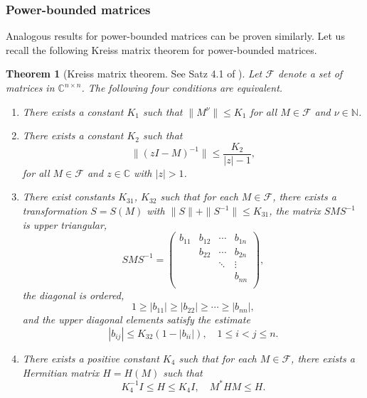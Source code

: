 \documentclass{article}
\theoremstyle{plain}%
\newtheorem{theorem}{Theorem}%
\theoremstyle{definition}%
\theoremstyle{remark}%
\newcommand{\bC}{\mathbb{C}}
\newcommand{\bN}{\mathbb{N}}
\newcommand{\cF}{\mathcal{F}}
\newcommand{\+}[1]{{\bm{#1}}}
\newcommand{\norm}[1]{\|{#1}\|}
\begin{document}
\subsubsection{Power-bounded matrices}
Analogous results for power-bounded matrices can be proven similarly. 
Let us recall the following Kreiss matrix theorem 
\cite{kreiss_stabilitatsdefinition_1962} for power-bounded matrices.
\begin{theorem}[Kreiss matrix theorem. See Satz 4.1 of 
  \cite{kreiss_stabilitatsdefinition_1962}]
  \label{thm:KMT_power}
Let $\cF$ denote a set of matrices in $\bC^{n \times n}$.
The following four conditions are equivalent.
\begin{enumerate}
  \item There exists a constant $K_1$ such that  
    $\norm{M^\nu} \le K_1$ for all $M \in \cF$ and 
    $\nu \in \bN$.
  \item There exists a constant $K_2$ such that 
    \begin{displaymath}
      \norm{(z I - M)^{-1}} \le \frac{K_2}{|z| - 1}, 
    \end{displaymath}
    for all $M \in \cF$ and $z \in \bC$ with $|z| > 1$.
  \item There exist constants $K_{31}$, $K_{32}$ such that 
    for each $M \in \cF$, there exists a 
    transformation $S = S(M)$ with 
    $\norm{S} + \norm{S^{-1}} \le K_{31}$,
    the matrix $S M S^{-1}$ is upper triangular,
    \begin{displaymath}
      S M S^{-1} = \begin{pmatrix}
        b_{11} & b_{12} & \cdots & b_{1n} \\
              & b_{22} & \cdots & b_{2n} \\
              &    & \ddots & \vdots \\
              &    &    & b_{nn} \\
      \end{pmatrix},
    \end{displaymath}
    the diagonal is ordered, 
    \begin{displaymath}
      1 \ge |b_{11}| \ge |b_{22}| \ge \cdots \ge 
      |b_{nn}|,
    \end{displaymath}
    and the upper diagonal elements satisfy the estimate 
    \begin{displaymath}
      |b_{ij}| \le K_{32} (1 - |b_{ii}|), \quad 
        1 \le i < j \le n.
    \end{displaymath}
  \item There exists a positive constant $K_4$ such that 
    for each $M \in \cF$, there exists a Hermitian 
    matrix $H = H(M)$ such that 
    \begin{displaymath}
      K_4^{-1} I \le H \le K_4 I, \quad M^* H M \le H.
    \end{displaymath}
\end{enumerate}
\end{theorem}
\end{document}

